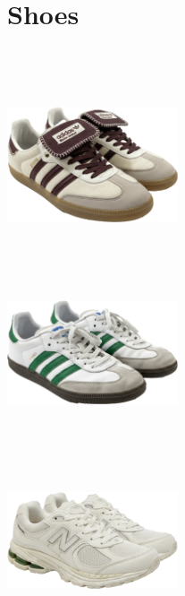 \documentclass[10pt]{article}
\begin{document}
\section*{Shoes}\
\vspace*{2mm}\noindent
\begin{minipage}[c][50.60mm][c]{50.60mm}\centering
\includegraphics[width=50.60mm,height=50.60mm,keepaspectratio]{assets/shoes/adidas-samba-white-bordeaux.png}\
\end{minipage} \hspace*{6.00mm} \begin{minipage}[c][50.60mm][c]{50.60mm}\centering
\includegraphics[width=50.60mm,height=50.60mm,keepaspectratio]{assets/shoes/adidas-samba-white-green.png}\
\end{minipage} \hspace*{6.00mm} \begin{minipage}[c][50.60mm][c]{50.60mm}\centering
\includegraphics[width=50.60mm,height=50.60mm,keepaspectratio]{assets/shoes/new-balance-white.png}\
\end{minipage} \hspace*{6.00mm} \begin{minipage}[c][50.60mm][c]{50.60mm}\centering

\end{minipage}
\end{document}
